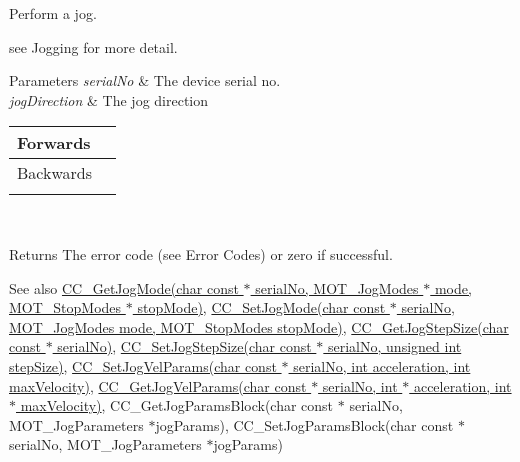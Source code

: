 Perform a jog. 

see Jogging for more detail.


\begin{DoxyParams}{Parameters}
{\em serial\+No} & The device serial no. \\
\hline
{\em jog\+Direction} & The jog direction \begin{tabularx}{\linewidth}{|*{2}{>{\raggedright\arraybackslash}X|}}\hline
Forwards&1 \\\cline{1-2}
Backwards&2 \\\cline{1-2}
\end{tabularx}
\\
\hline
\end{DoxyParams}
\begin{DoxyReturn}{Returns}
The error code (see Error Codes) or zero if successful. 
\end{DoxyReturn}
\begin{DoxySeeAlso}{See also}
\hyperlink{group___k_cube_motorised_gripper_gad0854b1ff5f4f234180a5b121deba1a5}{C\+C\+\_\+\+Get\+Jog\+Mode(char const $\ast$ serial\+No, M\+O\+T\+\_\+\+Jog\+Modes $\ast$ mode, M\+O\+T\+\_\+\+Stop\+Modes $\ast$ stop\+Mode)}, \hyperlink{group___k_cube_motorised_gripper_gade52d60961e1236833ff28b57298e965}{C\+C\+\_\+\+Set\+Jog\+Mode(char const $\ast$ serial\+No, M\+O\+T\+\_\+\+Jog\+Modes mode, M\+O\+T\+\_\+\+Stop\+Modes stop\+Mode)}, \hyperlink{group___k_cube_motorised_gripper_gabc6f2331e5a9c4e49548a6b9ad810bea}{C\+C\+\_\+\+Get\+Jog\+Step\+Size(char const $\ast$ serial\+No)}, \hyperlink{group___k_cube_motorised_gripper_ga39d7bbe3a44363bf3f90638f8774abc5}{C\+C\+\_\+\+Set\+Jog\+Step\+Size(char const $\ast$ serial\+No, unsigned int step\+Size)}, \hyperlink{group___k_cube_motorised_gripper_ga055a75c8f0532a131e82fec7fd901e2f}{C\+C\+\_\+\+Set\+Jog\+Vel\+Params(char const $\ast$ serial\+No, int acceleration, int max\+Velocity)}, \hyperlink{group___k_cube_motorised_gripper_gaf4e074bc5c1ab001a2f0d14b3cbc1346}{C\+C\+\_\+\+Get\+Jog\+Vel\+Params(char const $\ast$ serial\+No, int $\ast$ acceleration, int $\ast$ max\+Velocity)}, C\+C\+\_\+\+Get\+Jog\+Params\+Block(char const $\ast$ serial\+No, M\+O\+T\+\_\+\+Jog\+Parameters $\ast$jog\+Params), C\+C\+\_\+\+Set\+Jog\+Params\+Block(char const $\ast$ serial\+No, M\+O\+T\+\_\+\+Jog\+Parameters $\ast$jog\+Params)


\end{DoxySeeAlso}

\begin{DoxyCodeInclude}
\end{DoxyCodeInclude}
